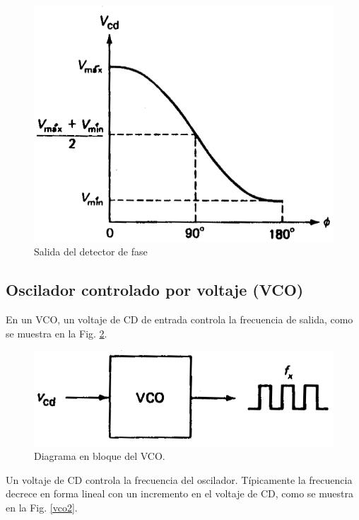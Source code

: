 \documentclass[10pt,a4paper]{IEEEtran}
\begin{document}
    \begin{figure}[H]
        \centering
        \includegraphics[scale=0.3]{def2.png}
        \caption{Salida del detector de fase}
        \label{def2}
    \end{figure}
    
    \subsection{Oscilador controlado por voltaje (VCO)}
    En un VCO, un voltaje de CD de entrada controla la frecuencia de salida, como se muestra en la Fig. \ref{vco1}.
    
    \begin{figure}[H]
        \centering
        \includegraphics[scale=0.3]{vco1.png}
        \caption{Diagrama en bloque del VCO.}
        \label{vco1}
    \end{figure}
    
    Un voltaje de CD controla la frecuencia del oscilador. Típicamente la frecuencia decrece en forma lineal con un incremento en el voltaje de CD, como se muestra en la Fig. \ref{vco2}.
    
\end{document}
